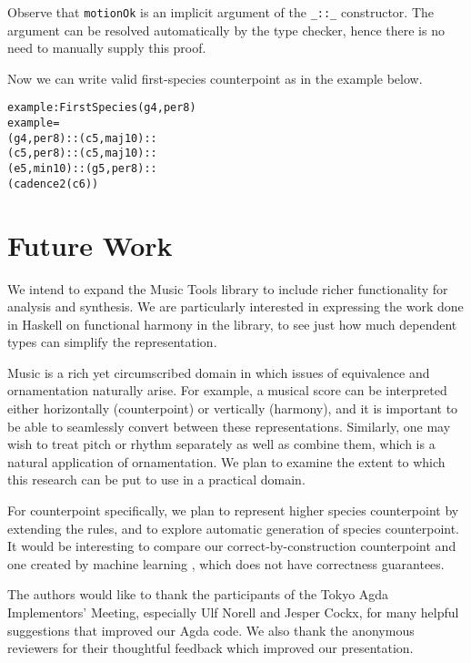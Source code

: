 \documentclass[sigplan,10pt,screen]{acmart}
\begin{document}
\noindent Observe that \texttt{motionOk} is an implicit argument of 
the \texttt{\_::\_} constructor. 
The argument can be resolved automatically by the type checker,
hence there is no need to manually supply this proof. 

Now we can write valid first-species counterpoint as in the 
example below.

\begin{alltt}
example : FirstSpecies (g 4 , per8)
example = 
  (g 4 , per8) :: (c 5 , maj10) ::
  (c 5 , per8) :: (c 5 , maj10) ::
  (e 5 , min10) :: (g 5 , per8) ::
  (cadence2 (c 6))
\end{alltt}


\section{Future Work}

We intend to expand the Music Tools library to include
richer functionality for analysis and synthesis. We are
particularly interested in expressing the work done in Haskell
on functional harmony in the library, to see just how much
dependent types can simplify the representation.

Music is a rich yet circumscribed domain in which
issues of equivalence \citep{tabareau2017equivalences}
and ornamentation \citep{dagand2017essence} naturally arise.
For example, a
musical score can be interpreted either horizontally (counterpoint) or
vertically (harmony), and it is important to be able to seamlessly
convert between these representations. Similarly, one may wish to treat
pitch or rhythm separately as well as combine them, which is a natural
application of ornamentation. We plan to examine the extent to which this
research can be put to use in a practical domain.

For counterpoint specifically, we plan to represent higher species 
counterpoint by extending the rules, 
and to explore automatic generation of species counterpoint.
It would be interesting to compare our correct-by-construction counterpoint
and one created by machine learning \citep{CounterpointByConvolution}, 
which does not have correctness guarantees.

\begin{acks}                            %
 The authors would like to thank the participants of the Tokyo Agda 
 Implementors' Meeting, especially Ulf Norell and Jesper Cockx,
 for many helpful suggestions that improved our Agda code.
 We also thank the anonymous reviewers for their thoughtful feedback
 which improved our presentation.
\end{acks}



\end{document}
